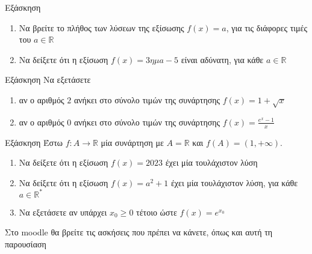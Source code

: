 \documentclass[greek]{beamer}
\begin{document}
\begin{frame}{Εξάσκηση}
 \href{https://www.geogebra.org/m/dvzdm7bw}{}
 \begin{enumerate}
  \item<1-> Να βρείτε το πλήθος των λύσεων της εξίσωσης $f(x)=a$, για τις διάφορες τιμές του $a\in\mathbb{R}$
  \item<2-> Να δείξετε ότι η εξίσωση $f(x)=3ημ a - 5$ είναι αδύνατη, για κάθε $a\in\mathbb{R}$
 \end{enumerate}
\end{frame}

\begin{frame}{Εξάσκηση}
 Να εξετάσετε
 \begin{enumerate}
  \item<1-> αν ο αριθμός $2$ ανήκει στο σύνολο τιμών της συνάρτησης $f(x)=1+\sqrt{x}$
  \item<2-> αν ο αριθμός $0$ ανήκει στο σύνολο τιμών της συνάρτησης $f(x)=\frac{e^x-1}{x}$
 \end{enumerate}
\end{frame}

\begin{frame}{Εξάσκηση}
 Έστω $f:A\to\mathbb{R}$ μία συνάρτηση με $A=\mathbb{R}$ και $f(A)=(1,+\infty)$.
 \begin{enumerate}
  \item<1-> Να δείξετε ότι η εξίσωση $f(x)=2023$ έχει μία τουλάχιστον λύση
  \item<2-> Να δείξετε ότι η εξίσωση $f(x)=a^2+1$ έχει μία τουλάχιστον λύση, για κάθε $a\in\mathbb{R^*}$
  \item<3-> Να εξετάσετε αν υπάρχει $x_0\ge 0$ τέτοιο ώστε $f(x)=e^{x_0}$
 \end{enumerate}
\end{frame}

\begin{frame}
 Στο moodle θα βρείτε τις ασκήσεις που πρέπει να κάνετε, όπως και αυτή τη παρουσίαση
\end{frame}
\end{document}
